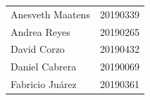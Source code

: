 \begin{titlepage}
\begin{center}
        
        \begin{flushleft}
            \begin{tabular}{ ll }
                Anesveth Maatens & 20190339 \\
                Andrea Reyes     & 20190265 \\
                David Corzo      & 20190432 \\
                Daniel Cabrera   & 20190069 \\
                Fabricio Juárez  & 20190361 \\ 
            \end{tabular}
        \end{flushleft}     
    \end{center}
\end{titlepage}
